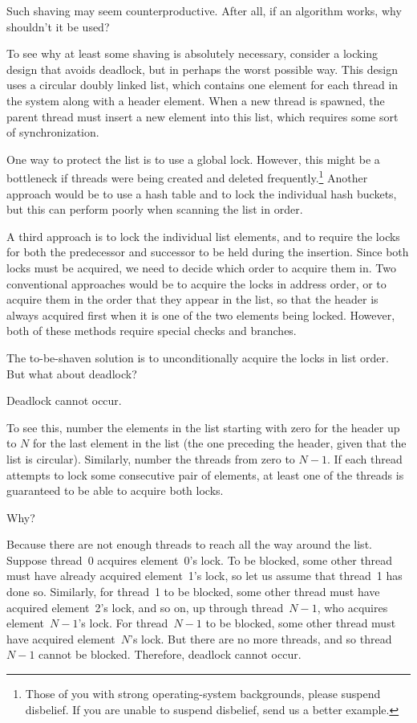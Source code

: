 Such shaving may seem counterproductive.
After all, if an algorithm works, why shouldn't it be used?

To see why at least some shaving is absolutely necessary, consider
a locking design that avoids deadlock, but in perhaps the worst possible way.
This design uses a circular doubly linked list, which contains one
element for each thread in the system along with a header element.
When a new thread is spawned, the parent thread must insert a new
element into this list, which requires some sort of synchronization.

One way to protect the list is to use a global lock.
However, this might be a bottleneck if threads were being created and
deleted frequently.\footnote{
	Those of you with strong operating-system backgrounds, please
	suspend disbelief.
	If you are unable to suspend disbelief, send us a better example.}
Another approach would be to use a hash table and to lock the individual
hash buckets, but this can perform poorly when scanning the list in order.

A third approach is to lock the individual list elements, and to require
the locks for both the predecessor and successor to be held during the
insertion.
Since both locks must be acquired, we need to decide which order to
acquire them in.
Two conventional approaches would be to acquire the locks in address
order, or to acquire them in the order that they appear in the list,
so that the header is always acquired first when it is one of the two
elements being locked.
However, both of these methods require special checks and branches.

The to-be-shaven solution is to unconditionally acquire the locks in
list order.
But what about deadlock?

Deadlock cannot occur.

To see this, number the elements in the list starting with zero for the
header up to $N$ for the last element in the list (the one preceding the
header, given that the list is circular).
Similarly, number the threads from zero to $N-1$.
If each thread attempts to lock some consecutive pair of elements,
at least one of the threads is guaranteed to be able to acquire both
locks.

Why?

Because there are not enough threads to reach all the way around the list.
Suppose thread~0 acquires element~0's lock.
To be blocked, some other thread must have already acquired element~1's
lock, so let us assume that thread~1 has done so.
Similarly, for thread~1 to be blocked, some other thread must have acquired
element~2's lock, and so on, up through thread~$N-1$, who acquires
element~$N-1$'s lock.
For thread~$N-1$ to be blocked, some other thread must have acquired
element~$N$'s lock.
But there are no more threads, and so thread~$N-1$ cannot be blocked.
Therefore, deadlock cannot occur.

